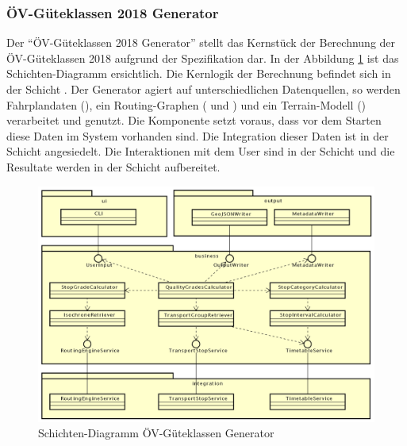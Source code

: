 \subsubsection{ÖV-Güteklassen 2018 Generator}
\label{container:generator}

Der "`\acs{ÖV}-Güteklassen 2018 Generator"' stellt das Kernstück der Berechnung der \acs{ÖV}-Güteklassen 2018 aufgrund der Spezifikation dar.
In der Abbildung \ref{fig:layer_diagram_generator} ist das Schichten-Diagramm ersichtlich.
Die Kernlogik der Berechnung befindet sich in der Schicht .
Der Generator agiert auf unterschiedlichen Datenquellen, so werden Fahrplandaten (), ein Routing-Graphen ( und ) und ein Terrain-Modell () verarbeitet und genutzt.
Die Komponente setzt voraus, dass vor dem Starten diese Daten im System vorhanden sind.
Die Integration dieser Daten ist in der Schicht  angesiedelt.
Die Interaktionen mit dem User sind in der Schicht  und die Resultate werden in der Schicht  aufbereitet.

\begin{figure}[ht]
    \centering
    \includegraphics[width=1.0\linewidth]{projectdoc/img/guetklassen_generator_architektur.png}
    \caption[Schichten-Diagramm ÖV-Güteklassen Generator]{Schichten-Diagramm ÖV-Güteklassen Generator}
    \label{fig:layer_diagram_generator}
\end{figure}

